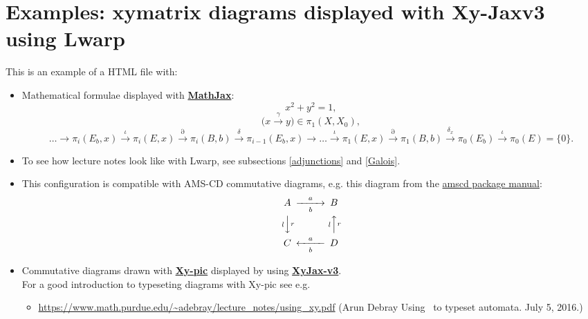 \documentclass[a4paper,12pt]{article}
\newtheorem{Fundamental Theorem}{Fundamental Theorem}
\newcommand{\ra}[1]{\xrightarrow{#1}}
\newcommand{\Q}{\mathbb{Q}}
\renewcommand{\a}{{\alpha}}
\def \w {\omega}
\def \e {\epsilon}
\def \z {\zeta}
\def \d {\partial}
\begin{document}
\section{Examples: xymatrix diagrams displayed with Xy-Jaxv3 using Lwarp}\label{sec:context}

This is an example of a HTML file with:
\begin{itemize}
\item Mathematical formulae displayed with  \href{https://www.mathjax.org/}{\textbf{MathJax}}:
\begin{equation}\label{test}
   x^2+y^2=1,
\end{equation}
$$\big ( x \ra{ \gamma } y\big) \in \pi_1(X,X_0),
$$
$$
\dots \to \pi_i(E_b,x) \ra{\iota} \pi_i(E,x) \ra{\d}  \pi_i(B,b) \ra{\delta}  \pi_{i-1}(E_b,x) \to \dots
 \ra{\iota} \pi_1(E,x) \ra{\partial}  \pi_1(B,b) \ra{\delta_x} \pi_0(E_b) \ra{\iota} \pi_0(E)=\{0\}.
$$

\item To see how lecture notes look like with Lwarp, see subsections \ref{adjunctions} and \ref{Galois}.
\item 
This configuration is compatible with AMS-CD commutative diagrams, e.g. this diagram from the \href{https://www.jmilne.org/not/Mamscd.pdf}{amscd package manual}:
\[
\begin{CD}
A @>a>b> B\\
@VlVrV @AlArA\\
C @<a<b< D
\end{CD}
\]\begin{quotation}
  \end{quotation}

\item  Commutative diagrams drawn with \href{https://tug.org/applications/Xy-pic/}{\textbf{Xy-pic}} displayed by using \href{https://github.com/sonoisa/XyJax-v3}{\textbf{XyJax-v3}}.\\
For a good introduction to typeseting diagrams with Xy-pic see e.g.
\begin{itemize}
 \item \url{https://www.math.purdue.edu/~adebray/lecture_notes/using_xy.pdf} (Arun Debray
Using \Xy\ to typeset automata.
July 5, 2016.)



\end{itemize}
\end{itemize}
\end{document}
